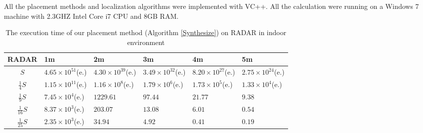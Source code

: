 \documentclass[10pt, conference, letterpaper]{IEEEtran}
\begin{document}
All the placement methods and localization algorithms were implemented with VC++. All the calculation were running on a Windows 7 machine with 2.3GHZ Intel Core i7 CPU and 8GB RAM.

\begin{table}[!t]
\renewcommand{\arraystretch}{1.0}
\caption{The execution time of our placement method (Algorithm \ref{Synthesize}) on RADAR in indoor environment} \label{experiment_time_RADAR}
\centering
\begin{tabular}{|c|p{0.9cm}|p{0.9cm}|p{0.9cm}|p{0.9cm}|p{0.9cm}|}
  \hline
RADAR  & 1m & 2m & 3m & 4m & 5m \\
  \hline
  $S$ & $4.65 \times 10^{51}$(e.) & $4.30 \times 10^{39}$(e.) & $3.49 \times 10^{32}$(e.) & $8.20 \times 10^{27}$(e.) & $2.75 \times 10^{24}$(e.)  \\
  \hline
  $\frac{1}{4}S$ & $1.15 \times 10^{11}$(e.) & $1.16 \times 10^{8}$(e.) & $1.79 \times 10^{6}$(e.) & $1.73 \times 10^{5}$(e.) & $1.33 \times 10^{4}$(e.) \\
  \hline
  $\frac{1}{9}S$ & $7.45 \times 10^{4}$(e.) & $1229.61$ & $97.44$ & $21.77$ & $9.38$ \\
  \hline
  $\frac{1}{16}S$ & $8.37 \times 10^{3}$(e.) & $203.07$ & $13.08$ & $6.01$ & $0.54$ \\
  \hline
  $\frac{1}{25}S$ & $2.35 \times 10^{3}$(e.) & $34.94$ & $4.92$ & $0.41$ & $0.19$ \\
  \hline
\end{tabular}
\end{table}
\end{document}
